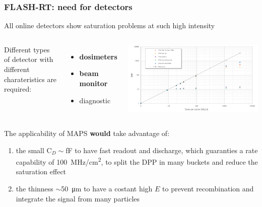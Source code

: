     \begin{frame}
        \frametitle{FLASH-RT: need for detectors}
        All online detectors show saturation problems at such high intensity
        \medskip
        \begin{columns}
            Different types of detector with different charateristics are required: 
                \begin{itemize}
                    \item \textbf{dosimeters} 
                    \item \textbf{beam monitor} 
                    \item diagnostic 
                \end{itemize}
                \includegraphics[width=1.1\linewidth]{figures/pixel_detectors_usage/saturation_dosimeters.pdf}
        \end{columns}
        \bigskip
        The applicability of MAPS \textbf{would} take advantage of: 
        \begin{enumerate}
            \item the small C$_D \sim$\si{fF} to have fast readout and discharge, which guaranties a rate capability of \SI{100}{MHz/cm\squared}, to split the DPP in many buckets and reduce the saturation effect
            \item the thinness $\sim$\SI{50}{\um} to have a costant high $E$ to prevent recombination and integrate the signal from many particles
        \end{enumerate}
    \end{frame}     


